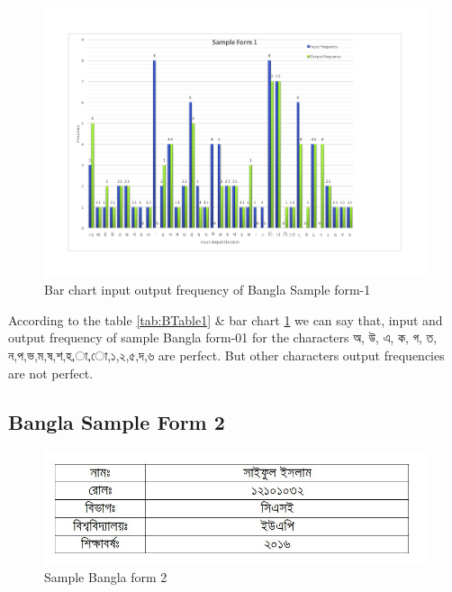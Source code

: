 \begin{figure}[H]
\centering
\includegraphics[width=1\textwidth]{Bform1.pdf}
\caption {Bar chart input output frequency of Bangla Sample form-1}
\label {fig:Bbar1}
\end{figure}


According to the table \ref{tab:BTable1} \& bar chart \ref{fig:Bbar1} we can say that, input and output frequency of sample Bangla form-01 for the characters {\bengalifont অ}, {\bengalifont উ}, {\bengalifont এ}, {\bengalifont ক}, {\bengalifont গ}, {\bengalifont ত}, {\bengalifont ন},{\bengalifont প},{\bengalifont ভ},{\bengalifont ম},{\bengalifont ষ},{\bengalifont শ},{\bengalifont হ},{\bengalifont া},{\bengalifont ো},{\bengalifont ১},{\bengalifont ২},{\bengalifont ৫},{\bengalifont দ},{\bengalifont ৬} are perfect. But other characters output frequencies are not perfect.

\subsection{Bangla Sample Form 2}
\begin{figure}[H]
\centering
\includegraphics[width=1\textwidth]{formBen02.JPG}
\caption {Sample Bangla form 2}
\label {fig:FormBan2}
\end{figure}

